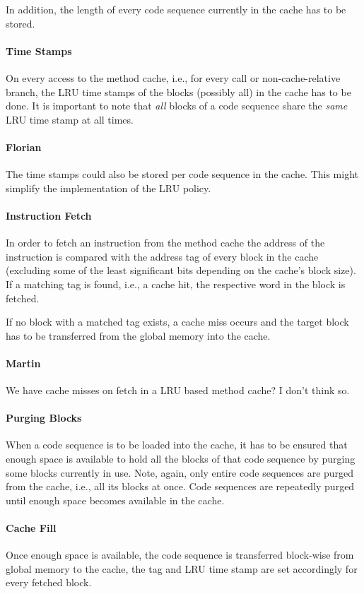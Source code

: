\documentclass{IEEEtran}
\newcommand{\comment}[3]{\paragraph*{\textbf{#1}}{\color{#3}#2}}
\newcommand{\martin}[1]{\comment{Martin}{#1}{Blue}}
\newcommand{\fb}[1]{\comment{Florian}{#1}{Emerald}}
\begin{document}
In addition, the length of every code sequence currently in the cache has to be
stored.

\paragraph*{Time Stamps}
On every access to the method cache, i.e., for every call or non-cache-relative
branch, the LRU time stamps of the blocks (possibly all) in the cache has to be
done. It is important to note that \emph{all} blocks of a code sequence share
the \emph{same} LRU time stamp at all times.

\fb{The time stamps could also be stored per code sequence in the cache. This
    might simplify the implementation of the LRU policy.}

\paragraph*{Instruction Fetch}
In order to fetch an instruction from the method cache the address of the
instruction is compared with the address tag of every block in the cache
(excluding some of the least significant bits depending on the cache's block
size). If a matching tag is found, i.e., a cache hit, the respective word in the
block is fetched.

If no block with a matched tag exists, a cache miss occurs and the target block
has to be transferred from the global memory into the cache.
\martin{We have cache misses on fetch in a LRU based method cache? I don't think so.}

\paragraph*{Purging Blocks}
When a code sequence is to be loaded into the cache, it has to be ensured that
enough space is available to hold all the blocks of that code sequence by
purging some blocks currently in use. Note, again, only entire code sequences
are purged from the cache, i.e., all its blocks at once. Code sequences are
repeatedly purged until enough space becomes available in the cache.

\paragraph*{Cache Fill}
Once enough space is available, the code sequence is transferred block-wise from
global memory to the cache, the tag and LRU time stamp are set accordingly for
every fetched block.
\end{document}
